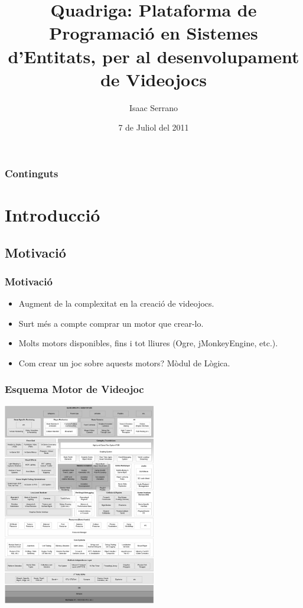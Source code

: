 \documentclass[serif,9pt]{beamer}
\begin{document}
\title[Quadriga]{Quadriga: Plataforma de Programació en Sistemes d'Entitats, per al desenvolupament de Videojocs}  
\author{Isaac Serrano}
\date{7 de Juliol del 2011}

\begin{frame}
\titlepage
\end{frame}

\begin{frame}
\frametitle{Continguts}
\tableofcontents
\end{frame}

\section{Introducció}

  \subsection{Motivació}

    \begin{frame}\frametitle{Motivació}
     \begin{itemize}
      \item Augment de la complexitat en la creació de videojocs.\bigskip
      \item Surt més a compte comprar un motor que crear-lo. \bigskip
      \item Molts motors disponibles, fins i tot lliures (Ogre, jMonkeyEngine, etc.).\bigskip
      \item Com crear un joc sobre aquests motors? Mòdul de Lògica.
     \end{itemize}
    \end{frame}
    

    \begin{frame}\frametitle{Esquema Motor de Videojoc}
      \begin{center}
        \includegraphics[width=0.50\textwidth]{./img/Fig-RuntimeArch.jpg}
      \end{center}
    \end{frame}
\end{document}
